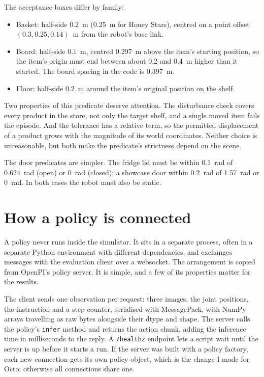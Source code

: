 The acceptance boxes differ by family:
\begin{itemize}[leftmargin=2em,itemsep=0.15em]
\item Basket: half-side 0.2~m (0.25~m for Honey Stars), centred on a point offset $(0.3, 0.25, 0.14)$~m from the robot's base link.
\item Board: half-side 0.1~m, centred 0.297~m above the item's starting position, so the item's origin must end between about 0.2 and 0.4~m higher than it started. The board spacing in the code is 0.397~m.
\item Floor: half-side 0.2~m around the item's original position on the shelf.
\end{itemize}

Two properties of this predicate deserve attention. The disturbance check covers every product in the store, not only the target shelf, and a single moved item fails the episode. And the tolerance has a relative term, so the permitted displacement of a product grows with the magnitude of its world coordinates. Neither choice is unreasonable, but both make the predicate's strictness depend on the scene.

The door predicates are simpler. The fridge lid must be within 0.1~rad of 0.624~rad (open) or 0~rad (closed); a showcase door within 0.2~rad of 1.57~rad or 0~rad. In both cases the robot must also be static.

\section{How a policy is connected}
\label{sec:interface}

A policy never runs inside the simulator. It sits in a separate process, often in a separate Python environment with different dependencies, and exchanges messages with the evaluation client over a websocket. The arrangement is copied from OpenPI's policy server. It is simple, and a few of its properties matter for the results.

The client sends one observation per request: three images, the joint positions, the instruction and a step counter, serialised with MessagePack, with NumPy arrays travelling as raw bytes alongside their dtype and shape. The server calls the policy's \texttt{infer} method and returns the action chunk, adding the inference time in milliseconds to the reply. A \texttt{/healthz} endpoint lets a script wait until the server is up before it starts a run. If the server was built with a policy factory, each new connection gets its own policy object, which is the change I made for Octo; otherwise all connections share one.

